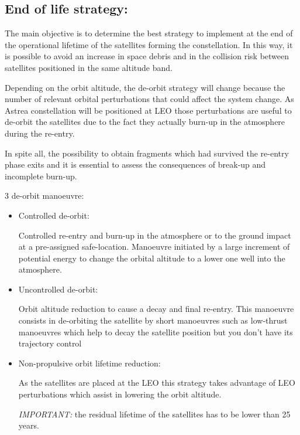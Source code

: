 \documentclass{article}
\begin{document}
\subsection{End of life strategy: }

The main objective is to determine the best strategy to implement at the end of the operational lifetime of the satellites forming the constellation. In this way, it is possible to avoid an increase in space debris and in the collision risk between satellites positioned in the same altitude	band. 


Depending on the orbit altitude, the de-orbit strategy will change because the number of relevant orbital perturbations that could affect the system change. As Astrea constellation will be positioned at LEO those perturbations are useful to de-orbit the satellites due to the fact they actually burn-up in the atmosphere during the re-entry. 


In spite all, the possibility to obtain fragments which had survived the re-entry phase exits and it is essential to assess the consequences of break-up and incomplete burn-up.



3 de-orbit manoeuvre:


\begin{itemize}

\item Controlled de-orbit:

Controlled re-entry and burn-up in the atmosphere or to the ground impact at a pre-assigned safe-location. 
Manoeuvre initiated by a large increment of potential energy to change the orbital altitude to a lower one well into the atmosphere.

\item Uncontrolled de-orbit:

Orbit altitude reduction to cause a decay and final re-entry. This manoeuvre consists in de-orbiting the satellite by short manoeuvres such as low-thrust manoeuvres which help to decay the satellite position but you don’t have its trajectory control

\item Non-propulsive orbit lifetime reduction:

As the satellites are placed at the LEO this strategy takes advantage of LEO perturbations which assist in lowering the orbit altitude.

\emph{IMPORTANT:} the residual lifetime of the satellites has to be lower than 25 years.

\end{itemize}
\end{document}

